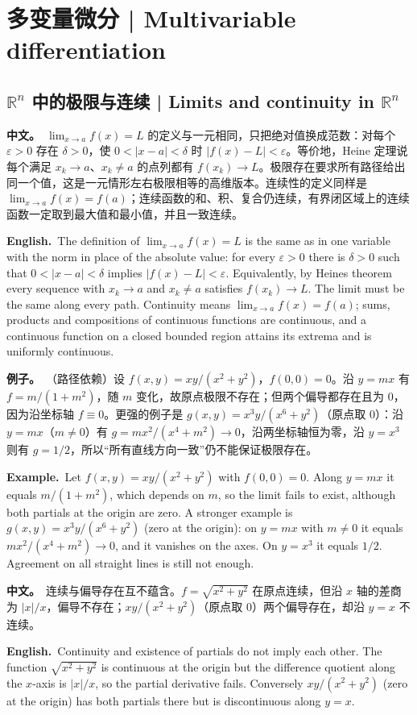\documentclass[UTF8,11pt,a4paper]{ctexart}
\newcommand{\BOTH}[2]{\par\noindent\textbf{中文。}\ #1\par\noindent\textbf{English.}\ #2\par}
\newcommand{\EX}[2]{\par\noindent\textbf{例子。}\ #1\par\noindent\textbf{Example.}\ #2\par}
\begin{document}
\setcounter{section}{11}
\section{多变量微分 | Multivariable differentiation}

\subsection{$\mathbb R^n$ 中的极限与连续 | Limits and continuity in $\mathbb R^n$}
\BOTH{$\lim_{x\to a}f(x)=L$ 的定义与一元相同，只把绝对值换成范数：对每个 $\varepsilon>0$ 存在 $\delta>0$，使 $0<|x-a|<\delta$ 时 $|f(x)-L|<\varepsilon$。等价地，Heine 定理说每个满足 $x_k\to a$、$x_k\ne a$ 的点列都有 $f(x_k)\to L$。极限存在要求所有路径给出同一个值，这是一元情形左右极限相等的高维版本。连续性的定义同样是 $\lim_{x\to a}f(x)=f(a)$；连续函数的和、积、复合仍连续，有界闭区域上的连续函数一定取到最大值和最小值，并且一致连续。}{The definition of $\lim_{x\to a}f(x)=L$ is the same as in one variable with the norm in place of the absolute value: for every $\varepsilon>0$ there is $\delta>0$ such that $0<|x-a|<\delta$ implies $|f(x)-L|<\varepsilon$. Equivalently, by Heine\textquotesingle s theorem every sequence with $x_k\to a$ and $x_k\ne a$ satisfies $f(x_k)\to L$. The limit must be the same along every path. Continuity means $\lim_{x\to a}f(x)=f(a)$; sums, products and compositions of continuous functions are continuous, and a continuous function on a closed bounded region attains its extrema and is uniformly continuous.}
\EX{（路径依赖）设 $f(x,y)=xy/(x^2+y^2)$，$f(0,0)=0$。沿 $y=mx$ 有 $f=m/(1+m^2)$，随 $m$ 变化，故原点极限不存在；但两个偏导都存在且为 $0$，因为沿坐标轴 $f\equiv0$。更强的例子是 $g(x,y)=x^3y/(x^6+y^2)$（原点取 $0$）：沿 $y=mx$（$m\ne0$）有 $g=mx^2/(x^4+m^2)\to0$，沿两坐标轴恒为零，沿 $y=x^3$ 则有 $g=1/2$，所以“所有直线方向一致”仍不能保证极限存在。}{Let $f(x,y)=xy/(x^2+y^2)$ with $f(0,0)=0$. Along $y=mx$ it equals $m/(1+m^2)$, which depends on $m$, so the limit fails to exist, although both partials at the origin are zero. A stronger example is $g(x,y)=x^3y/(x^6+y^2)$ (zero at the origin): on $y=mx$ with $m\ne0$ it equals $mx^2/(x^4+m^2)\to0$, and it vanishes on the axes. On $y=x^3$ it equals $1/2$. Agreement on all straight lines is still not enough.}
\BOTH{连续与偏导存在互不蕴含。$f=\sqrt{x^2+y^2}$ 在原点连续，但沿 $x$ 轴的差商为 $|x|/x$，偏导不存在；$xy/(x^2+y^2)$（原点取 $0$）两个偏导存在，却沿 $y=x$ 不连续。}{Continuity and existence of partials do not imply each other. The function $\sqrt{x^2+y^2}$ is continuous at the origin but the difference quotient along the $x$-axis is $|x|/x$, so the partial derivative fails. Conversely $xy/(x^2+y^2)$ (zero at the origin) has both partials there but is discontinuous along $y=x$.}
\end{document}
